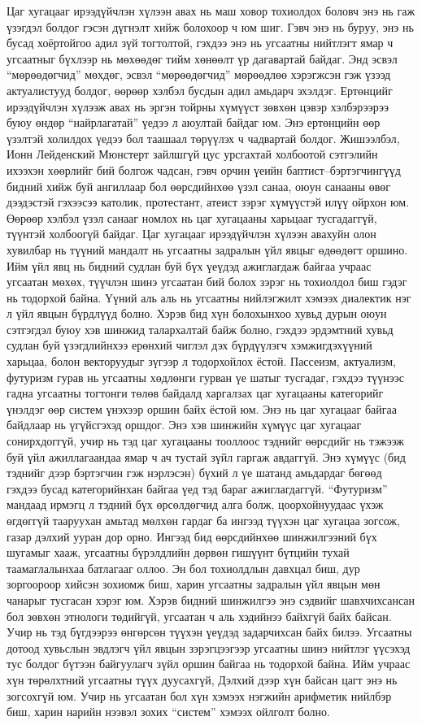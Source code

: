 Цаг хугацааг ирээдүйчлэн хүлээн авах нь маш ховор тохиолдох боловч энэ нь гаж үзэгдэл болдог гэсэн дүгнэлт хийж болохоор ч юм шиг. Гэвч энэ нь буруу, энэ нь бусад хоёртойгоо адил зүй тогтолтой, гэхдээ энэ нь угсаатны нийтлэгт ямар ч угсаатныг бүхлээр нь мөхөөдөг тийм хөнөөлт үр дагавартай байдаг. Энд эсвэл “мөрөөдөгчид” мөхдөг, эсвэл “мөрөөдөгчид” мөрөөдлөө хэрэгжсэн гэж үзээд актуалистууд болдог, өөрөөр хэлбэл бусдын адил амьдарч эхэлдэг.
Ертөнцийг ирээдүйчлэн хүлээж авах нь эргэн тойрны хүмүүст зөвхөн цэвэр хэлбэрээрээ буюу өндөр “найрлагатай” үедээ л аюултай байдаг юм. Энэ ертөнцийн өөр үзэлтэй холилдох үедээ бол таашаал төрүүлэх ч чадвартай болдог. Жишээлбэл, Ионн Лейденский Мюнстерт зайлшгүй цус урсгахтай холбоотой сэтгэлийн ихээхэн хөөрлийг бий болгож чадсан, гэвч орчин үеийн баптист–бэртэгчингүүд бидний хийж буй ангиллаар бол өөрсдийнхөө үзэл санаа, оюун санааны өвөг дээдэстэй гэхээсээ католик, протестант, атеист зэрэг хүмүүстэй илүү ойрхон юм. Өөрөөр хэлбэл үзэл санааг номлох нь цаг хугацааны харьцааг тусгадаггүй, түүнтэй холбоогүй байдаг. Цаг хугацааг ирээдүйчлэн хүлээн авахуйн олон хувилбар нь түүний мандалт нь угсаатны задралын үйл явцыг өдөөдөгт оршино. Ийм үйл явц нь бидний судлан буй бүх үеүдэд ажиглагдаж байгаа учраас угсаатан мөхөх, түүчлэн шинэ угсаатан бий болох зэрэг нь тохиолдол биш гэдэг нь тодорхой байна. Үүний аль аль нь угсаатны нийлэгжилт хэмээх диалектик нэг л үйл явцын бүрдлүүд болно. Хэрэв бид хүн болохынхоо хувьд дурын оюун сэтгэгдэл буюу хэв шинжид талархалтай байж болно, гэхдээ эрдэмтний хувьд судлан буй үзэгдлийнхээ ерөнхий чиглэл дэх бүрдүүлэгч хэмжигдэхүүний харьцаа, болон векторуудыг зүгээр л тодорхойлох ёстой.
Пассеизм, актуализм, футуризм гурав нь угсаатны хөдлөнги гурван үе шатыг тусгадаг, гэхдээ түүнээс гадна угсаатны тогтонги төлөв байдалд харгалзах цаг хугацааны категорийг үнэлдэг өөр систем үнэхээр оршин байх ёстой юм. Энэ нь цаг хугацааг байгаа байдлаар нь үгүйсгэхэд оршдог. Энэ хэв шинжийн хүмүүс цаг хугацааг сонирхдоггүй, учир нь тэд цаг хугацааны тооллоос тэднийг өөрсдийг нь тэжээж буй үйл ажиллагаандаа ямар ч ач тустай зүйл гаргаж авдаггүй. Энэ хүмүүс (бид тэднийг дээр бэртэгчин гэж нэрлэсэн) бүхий л үе шатанд амьдардаг бөгөөд гэхдээ бусад категорийнхан байгаа үед тэд бараг ажиглагдаггүй. “Футуризм” мандаад ирмэгц л тэдний бүх өрсөлдөгчид алга болж, цоорхойнуудаас үхэж өгдөггүй тааруухан амьтад мөлхөн гардаг ба ингээд түүхэн цаг хугацаа зогсож, газар дэлхий ууран дор орно.
Ингээд бид өөрсдийнхөө шинжилгээний бүх шугамыг хааж, угсаатны бүрэлдлийн дөрвөн гишүүнт бүтцийн тухай таамаглалынхаа батлагааг оллоо. Эн бол тохиолдлын давхцал биш, дур зоргоороор хийсэн зохиомж биш, харин угсаатны задралын үйл явцын мөн чанарыг тусгасан хэрэг юм. Хэрэв бидний шинжилгээ энэ сэдвийг шавхчихсансан бол зөвхөн этнологи төдийгүй, угсаатан ч аль хэдийнээ байхгүй байх байсан. Учир нь тэд бүгдээрээ өнгөрсөн түүхэн үеүдэд задарчихсан байх билээ. Угсаатны дотоод хувьслын эвдлэгч үйл явцын зэрэгцээгээр угсаатны шинэ нийтлэг үүсэхэд тус болдог бүтээн байгуулагч зүйл оршин байгаа нь тодорхой байна. Ийм учраас хүн төрөлхтний угсаатны түүх дуусахгүй, Дэлхий дээр хүн байсан цагт энэ нь зогсохгүй юм. Учир нь угсаатан бол хүн хэмээх нэгжийн арифметик нийлбэр биш, харин нарийн нээвэл зохих “систем” хэмээх ойлголт болно.
